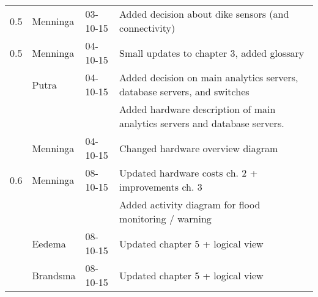 \begin{longtable}{L{} L{} L{} L{}}
	0.5              & Menninga              & 03-10-15      & Added decision about dike sensors (and connectivity)                                                                                                                                                                       \\
	0.5              & Menninga              & 04-10-15      & Small updates to chapter 3, added glossary                                                                                                                                                                                 \\
	                 & Putra                 & 04-10-15      & Added decision on main analytics servers, database servers, and switches                                                                                                                                                   \\
	                 &                       &               & Added hardware description of main analytics servers and database servers.                                                                                                                                                 \\
	                 & Menninga              & 04-10-15      & Changed hardware overview diagram                                                                                                                                                                                          \\
	\midrule
	0.6              & Menninga              & 08-10-15      & Updated hardware costs ch. 2 + improvements ch. 3                                                                                                                                                                          \\
	                 &                       &               & Added activity diagram for flood monitoring / warning                                                                                                                                                                      \\
	                 & Eedema                & 08-10-15      & Updated chapter 5 + logical view                                                                                                                                                                                           \\
	                 & Brandsma              & 08-10-15      & Updated chapter 5 + logical view                                                                                                                                                                                           \\

\end{longtable}

